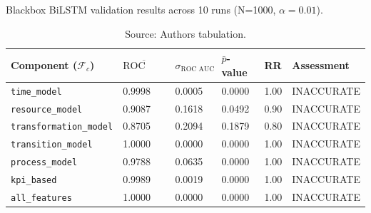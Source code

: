 \begin{table}[htbp]
    \centering
    \caption[Results BiLSTM]{Blackbox BiLSTM validation results across 10 runs (N=1000, $\alpha=0.01$).}
    \label{tab:results-blackbox}
    \begin{tabular}{l l l l l p{3cm}}
        \toprule
        \textbf{Component ($\mathcal{F}_c$)} & \textbf{$\overline{\text{ROC AUC}}$} & \textbf{$\sigma_{\text{ROC AUC}}$} & \textbf{$\bar{p}$-value} & \textbf{RR} & \textbf{Assessment} \\
        \midrule
        \texttt{time\_model}                 & 0.9998                               & 0.0005                             & 0.0000                   & 1.00        & INACCURATE          \\
        \texttt{resource\_model}             & 0.9087                               & 0.1618                             & 0.0492                   & 0.90        & INACCURATE          \\
        \texttt{transformation\_model}       & 0.8705                               & 0.2094                             & 0.1879                   & 0.80        & INACCURATE          \\
        \texttt{transition\_model}           & 1.0000                               & 0.0000                             & 0.0000                   & 1.00        & INACCURATE          \\
        \texttt{process\_model}              & 0.9788                               & 0.0635                             & 0.0000                   & 1.00        & INACCURATE          \\
        \texttt{kpi\_based}                  & 0.9989                               & 0.0019                             & 0.0000                   & 1.00        & INACCURATE          \\
        \texttt{all\_features}               & 1.0000                               & 0.0000                             & 0.0000                   & 1.00        & INACCURATE          \\
        \bottomrule
    \end{tabular}
    \caption*{Source: Authors tabulation.}
\end{table}

